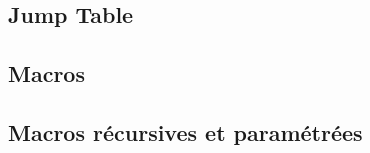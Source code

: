 \documentclass[a4paper]{article}
\begin{document}
\subsection{Jump Table}
\paragraph{}

\subsection{Macros}
\paragraph{}

\subsection{Macros récursives et paramétrées}
\end{document}
